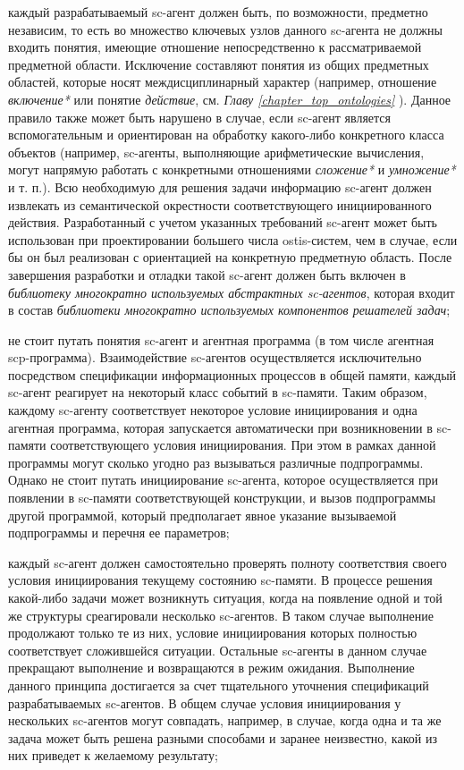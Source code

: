 \begin{textitemize}
\item каждый разрабатываемый sc-агент должен быть, по возможности, предметно независим, то есть во множество ключевых узлов данного sc-агента не должны входить понятия, имеющие отношение непосредственно к рассматриваемой предметной области. Исключение составляют понятия из общих предметных областей, которые носят междисциплинарный характер (например, отношение \textit{включение*} или понятие \textit{действие}, см. \textit{Главу \ref{chapter_top_ontologies} }). Данное правило также может быть нарушено в случае, если sc-агент является вспомогательным и ориентирован на обработку какого-либо конкретного класса объектов (например, sc-агенты, выполняющие арифметические вычисления, могут напрямую работать с конкретными отношениями \textit{сложение*} и \textit{умножение*} и т. п.). Всю необходимую для решения задачи информацию sc-агент должен извлекать из семантической окрестности соответствующего инициированного действия. Разработанный с учетом указанных требований sc-агент может быть использован при проектировании большего числа ostis-систем, чем в случае, если бы он был реализован с ориентацией на конкретную предметную область. После завершения разработки и отладки такой sc-агент должен быть включен в \textit{библиотеку многократно используемых абстрактных sc-агентов}, которая входит в состав \textit{библиотеки многократно используемых компонентов решателей задач};
\item не стоит путать понятия sc-агент и агентная программа (в том числе агентная scp-программа). Взаимодействие sc-агентов осуществляется исключительно посредством спецификации информационных процессов в общей памяти, каждый sc-агент реагирует на некоторый класс событий в sc-памяти. Таким образом, каждому sc-агенту соответствует некоторое условие инициирования и одна агентная программа, которая запускается автоматически при возникновении в sc-памяти соответствующего условия инициирования. При этом в рамках данной программы могут сколько угодно раз вызываться различные подпрограммы. Однако не стоит путать инициирование sc-агента, которое осуществляется при появлении в sc-памяти соответствующей конструкции, и вызов подпрограммы другой программой, который предполагает явное указание вызываемой подпрограммы и перечня ее параметров;
\item каждый sc-агент должен самостоятельно проверять полноту соответствия своего условия инициирования текущему состоянию sc-памяти. В процессе решения какой-либо задачи может возникнуть ситуация, когда на появление одной и той же структуры среагировали несколько sc-агентов. В таком случае выполнение продолжают только те из них, условие инициирования которых полностью соответствует сложившейся ситуации. Остальные sc-агенты в данном случае прекращают выполнение и возвращаются в режим ожидания. Выполнение данного принципа достигается за счет тщательного уточнения спецификаций разрабатываемых sc-агентов. В общем случае условия инициирования у нескольких sc-агентов могут совпадать, например, в случае, когда одна и та же задача может быть решена разными способами и заранее неизвестно, какой из них приведет к желаемому результату;

\end{textitemize}
